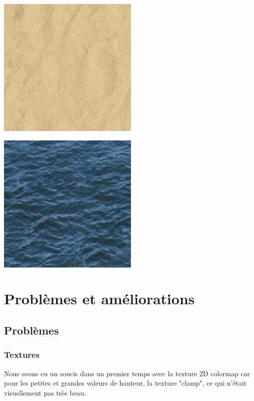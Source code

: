 \documentclass{article}
\begin{document}
\begin{minipage}[c]{0.46\linewidth}
\center
\includegraphics[scale=0.2]{../textures/sand.jpg}
\end{minipage}\hfill
\begin{minipage}[c]{0.46\linewidth}
\center
\includegraphics[scale=0.2]{../textures/water.jpg}
\end{minipage}\hfill

\section{Problèmes et améliorations}

\subsection{Problèmes}
\subsubsection{Textures}
Nous avons eu un soucis dans un premier temps avec la texture 2D colormap car pour les petites et grandes valeurs de hauteur, la texture "clamp", ce qui n'était visuellement pas très beau.\\
\end{document}
